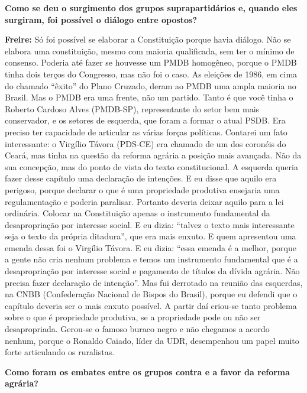 \textbf{Como se deu o surgimento dos grupos suprapartidários e, quando
eles surgiram, foi possível o diálogo entre opostos?}

\textbf{Freire:} Só foi possível se elaborar a Constituição porque havia
diálogo. Não se elabora uma constituição, mesmo com maioria qualificada,
sem ter o mínimo de consenso. Poderia até fazer se houvesse um PMDB
homogêneo, porque o PMDB tinha dois terços do Congresso, mas não foi o
caso. As eleições de 1986, em cima do chamado ``êxito'' do Plano
Cruzado, deram ao PMDB uma ampla maioria no Brasil. Mas o PMDB era uma
frente, não um partido. Tanto é que você tinha o Roberto Cardoso Alves
(PMDB-SP), representante do setor bem mais conservador, e os setores de
esquerda, que foram a formar o atual PSDB. Era preciso ter capacidade de
articular as várias forças políticas. Contarei um fato interessante: o
Virgílio Távora (PDS-CE) era chamado de um dos coronéis do Ceará, mas
tinha na questão da reforma agrária a posição mais avançada. Não da sua
concepção, mas do ponto de vista do texto constitucional. A esquerda
queria fazer desse capítulo uma declaração de intenções. E eu disse que
aquilo era perigoso, porque declarar o que é uma propriedade produtiva
ensejaria uma regulamentação e poderia paralisar. Portanto deveria
deixar aquilo para a lei ordinária. Colocar na Constituição apenas o
instrumento fundamental da desapropriação por interesse social. E eu
dizia: ``talvez o texto mais interessante seja o texto da própria
ditadura'', que era mais enxuto. E quem apresentou uma emenda dessa foi
o Virgílio Távora. E eu dizia: ``essa emenda é a melhor, porque a gente
não cria nenhum problema e temos um instrumento fundamental que é a
desapropriação por interesse social e pagamento de títulos da dívida
agrária. Não precisa fazer declaração de intenção''. Mas fui derrotado
na reunião das esquerdas, na CNBB (Confederação Nacional de Bispos do
Brasil), porque eu defendi que o capítulo deveria ser o mais enxuto
possível. A partir daí criou-se tanto problema sobre o que é propriedade
produtiva, se a propriedade pode ou não ser desapropriada. Gerou-se o
famoso buraco negro e não chegamos a acordo nenhum, porque o Ronaldo
Caiado, líder da UDR, desempenhou um papel muito forte articulando os
ruralistas.

\textbf{Como foram os embates entre os grupos contra e a favor da
reforma agrária?}

